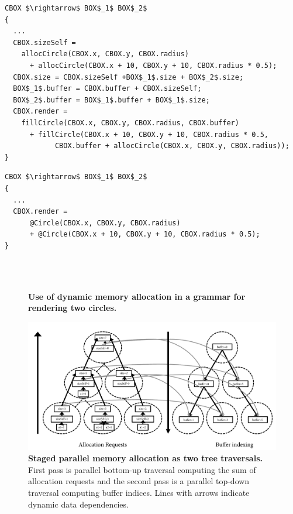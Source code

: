 \newsavebox{\twocirclesExpanded}
\begin{lrbox}{\twocirclesExpanded}%
\begin{lstlisting}[mathescape]
CBOX $\rightarrow$ BOX$_1$ BOX$_2$
{
  ...
  CBOX.sizeSelf = 
    allocCircle(CBOX.x, CBOX.y, CBOX.radius)
      + allocCircle(CBOX.x + 10, CBOX.y + 10, CBOX.radius * 0.5);
  CBOX.size = CBOX.sizeSelf +BOX$_1$.size + BOX$_2$.size;
  BOX$_1$.buffer = CBOX.buffer + CBOX.sizeSelf;
  BOX$_2$.buffer = BOX$_1$.buffer + BOX$_1$.size;
  CBOX.render = 
    fillCircle(CBOX.x, CBOX.y, CBOX.radius, CBOX.buffer)
      + fillCircle(CBOX.x + 10, CBOX.y + 10, CBOX.radius * 0.5,
            CBOX.buffer + allocCircle(CBOX.x, CBOX.y, CBOX.radius));
}
\end{lstlisting}
\end{lrbox}

\newsavebox{\twocirclesMacro}
\begin{lrbox}{\twocirclesMacro}%
\begin{lstlisting}[mathescape]
CBOX $\rightarrow$ BOX$_1$ BOX$_2$
{
  ...
  CBOX.render = 
      @Circle(CBOX.x, CBOX.y, CBOX.radius)
      + @Circle(CBOX.x + 10, CBOX.y + 10, CBOX.radius * 0.5);
}
\end{lstlisting}
\end{lrbox}




\begin{figure}
  \\
  \\
\caption{\textbf{Use of dynamic memory allocation in a grammar for rendering two circles.}}
\label{fig:stagedallocClient}
\end{figure}

\begin{figure}
\centering
\includegraphics[trim=0 0 0 0,clip,width=1.0\columnwidth]{chapter6/macro}
\caption{\textbf{Staged parallel memory allocation as two tree traversals.} First pass is parallel bottom-up traversal computing the sum of allocation requests and the second pass is a parallel top-down traversal computing buffer indices. Lines with arrows indicate dynamic data dependencies.}
\label{fig:renderingtraversal}
\end{figure}


